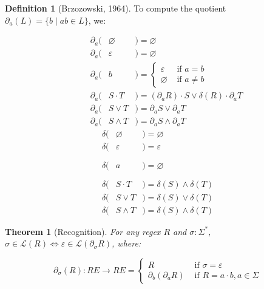 \documentclass[11pt]{article}
\theoremstyle{plain}
\newtheorem{theorem}{Theorem}
\theoremstyle{definition}
\newtheorem{definition}{Definition}
\begin{document}
\begin{definition}[Brzozowski, 1964]
To compute the quotient \(\partial_a(L) = \{b \mid ab \in L\}\), we:

\vspace{-0.8cm}
\begin{multicols}{2}
\begin{eqnarray*}
\phantom{--}\partial_a(& \varnothing &) = \varnothing                                           \\
\phantom{--}\partial_a(& \varepsilon &) = \varnothing                                           \\
\phantom{--}\partial_a(& b           &) = \begin{cases}\varepsilon &\text{ if } a = b\\ \varnothing &\text{ if } a \neq b \end{cases}\\
\phantom{--}\partial_a(& S\cdot T    &) = (\partial_a R)\cdot S \vee \delta(R)\cdot\partial_a T \\
\phantom{--}\partial_a(& S\vee  T    &) = \partial_a S \vee  \partial_a T                        \\
\phantom{--}\partial_a(& S\land T    &) = \partial_a S \land \partial_a T
\end{eqnarray*} \break\vspace{-0.45cm}
\begin{eqnarray*}
\delta(& \varnothing &)= \varnothing                                      \\
\delta(& \varepsilon &)= \varepsilon                                      \\
\delta(& a           &)= \varnothing\phantom{\begin{cases}\varepsilon\\\varnothing\end{cases}}\\
\delta(& S\cdot T    &)= \delta(S) \land \delta(T)                        \\
\delta(& S\vee T     &)= \delta(S) \vee  \delta(T)                        \\
\delta(& S\land T    &)= \delta(S) \land \delta(T)
\end{eqnarray*}
\end{multicols}
\end{definition}

\begin{theorem}[Recognition]
  For any regex \(R\) and \(\sigma: \Sigma^*\), \(\sigma \in \mathcal{L}(R) \Longleftrightarrow \varepsilon \in \mathcal{L}(\partial_\sigma R)\), where:

  \[
    \partial_\sigma (R): RE \rightarrow RE = \begin{cases}R &\text{ if } \sigma = \varepsilon\\\partial_b(\partial_a R) &\text{ if } R = a \cdot b, a \in \Sigma\end{cases}
  \]
\end{theorem}
\end{document}
